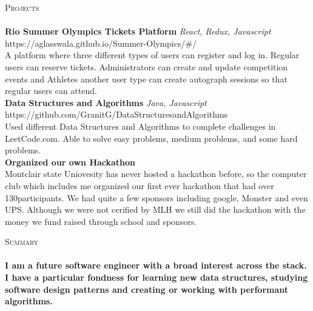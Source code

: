 \documentclass[a4paper]{article}
\newcommand{\lineunder} {
    \vspace*{-8pt} \\
    \hspace*{-18pt} \hrulefill \\
}
\newcommand{\header} [1] {
    {\hspace*{-18pt}\vspace*{6pt} \textsc{#1}}
    \vspace*{-6pt} \lineunder
}
\begin{document}
\header{Projects}
{\textbf{Rio Summer Olympics Tickets Platform}} {\sl React, Redux, Javascript} \hfill https://aglasswala.github.io/Summer-Olympics/\#/\\
A platform where three different types of users can register and log in. Regular users can reserve tickets. Administrators can create and update competition events and Athletes another user type can create autograph sessions so that regular users can attend.\\
\vspace*{2mm}
{\textbf{Data Structures and Algorithms}} {\sl Java, Javascript} \hfill https://github.com/GranitG/DataStructuresandAlgorithms\\
Used different Data Structures and Algorithms to complete challenges in LeetCode.com. Able to solve easy problems, medium problems, and some hard problems.\\
\vspace*{2mm}
{\textbf{Organized our own Hackathon}}\\
Montclair state Uniovesity has never hosted a hackathon before, so the computer club which includes me organized our first ever hackathon that had over 130participants. We had quite a few sponsors including google, Monster and even UPS. Although we were not cerified by MLH we still did the hackathon with the money we fund raised through school and sponsors.\\
\vspace*{2mm}

\header{Summary}
\textbf{I am a future software engineer with a broad interest across the stack. I have a particular fondness for learning new data structures, studying software design patterns and creating or working with performant algorithms.}\\

\vspace*{2mm}

\ 
\end{document}
